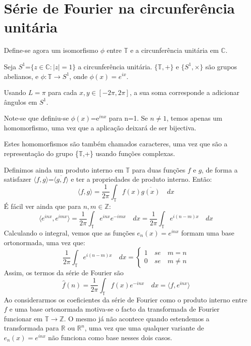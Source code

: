 \documentclass{article}
\begin{document}
\section{Série de Fourier na circunferência unitária}

Define-se agora um isomorfismo \(\phi\) entre \(\mathbb{T}\) e a circunferência unitária em \(\mathbb{C}\).

Seja \(S^{1}\)=\(\{ z \in\mathbb{C}:|z|=1\}\) a circunferência unitária. \(\{\mathbb{T},+ \}\) e \(\{S^{1},\times\}\) são grupos abelianos, e \(\phi: \mathbb{T}\rightarrow S^{1}\), onde \(\phi(x)=e^{ix}\). 

Usando \(L=\pi\) para cada \(x,y\in[-2\pi,2\pi]\), a sua soma corresponde a adicionar ângulos em \(S^{1}\).

Note-se que definiu-se \(\phi(x)\)=e\(^{inx}\) para n=1. Se \(n\neq1\), temos apenas um homomorfismo, uma vez que a aplicação deixará de ser bijectiva.

Estes homomorfismos são também chamados caracteres, uma vez que são a representação do grupo \{\(\mathbb{T}\),+\} usando funções complexas.

Definimos ainda um produto interno em \(\mathbb{T}\) para duas funções \(f\) e \(g\), de forma a satisfazer \(\langle f,g\rangle\)=\(\overline{\langle g,f\rangle}\) e ter a propriedades de produto interno\cite{maggie}. Então:
\[\langle f,g\rangle=\frac{1}{2\pi}\displaystyle\int_{\mathbb{T}}f(x)\overline{g(x)}\quad dx \]
É fácil ver ainda que para \(n,m\in \mathbb{Z}\):
\[\langle e^{inx},e^{imx}\rangle= \frac{1}{2\pi}\displaystyle\int_{\mathbb{T}}e^{inx}e^{-imx}\quad dx= \frac{1}{2\pi}\displaystyle\int_{\mathbb{T}}e^{i(n-m)x}\quad dx\]
Calculando o integral, vemos que as funções \(e_n(x)=e^{inx}\) formam uma base ortonormada, uma vez que:
\[\frac{1}{2\pi}\displaystyle\int_{\mathbb{T}}e^{i(n-m)x}\quad dx= \begin{cases} 1\quad se\quad m=n\\ 0 \quad se \quad m\neq n\end{cases}\]
Assim, os termos da série de Fourier são
\[\hat{f}(n)=\frac{1}{2\pi}\displaystyle\int_{\mathbb{T}}f(x)e^{-inx}\quad dx= \langle f,e^{inx}\rangle\]
Ao considerarmos os coeficientes da série de Fourier como o produto interno entre \(f\) e uma base ortonormada motiva-se o facto da transformada de Fourier funcionar em \(\mathbb{T}\to\mathbb{Z}\). O mesmo já não acontece quando estendemos a transformada para \(\mathbb{R}\) ou \(\mathbb{R}^{n}\), uma vez que uma qualquer variante de \(e_n(x)=e^{inx}\) não funciona como base nesses dois casos.
\end{document}
